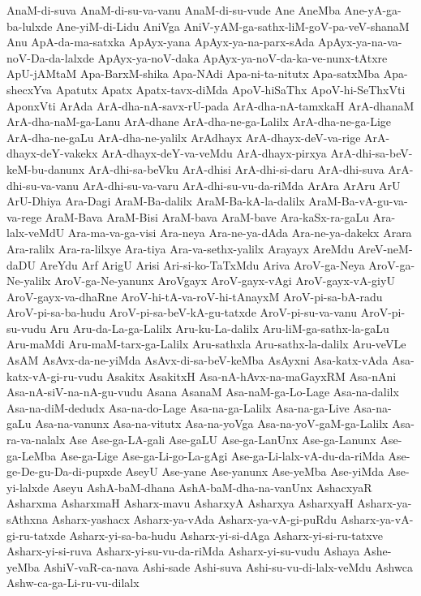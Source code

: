 {AnaM-di-suva
AnaM-di-su-va-vanu
AnaM-di-su-vude
Ane
AneMba
Ane-yA-ga-ba-lulxde
Ane-yiM-di-Lidu
AniVga
AniV-yAM-ga-sathx-liM-goV-pa-veV-shanaM
Anu
ApA-da-ma-satxka
ApAyx-yana
ApAyx-ya-na-parx-sAda
ApAyx-ya-na-va-noV-Da-da-lalxde
ApAyx-ya-noV-daka
ApAyx-ya-noV-da-ka-ve-nunx-tAtxre
ApU-jAMtaM
Apa-BarxM-shika
Apa-NAdi
Apa-ni-ta-nitutx
Apa-satxMba
Apa-shecxYva
Apatutx
Apatx
Apatx-tavx-diMda
ApoV-hiSaThx
ApoV-hi-SeThxVti
AponxVti
ArAda
ArA-dha-nA-savx-rU-pada
ArA-dha-nA-tamxkaH
ArA-dhanaM
ArA-dha-naM-ga-Lanu
ArA-dhane
ArA-dha-ne-ga-Lalilx
ArA-dha-ne-ga-Lige
ArA-dha-ne-gaLu
ArA-dha-ne-yalilx
ArAdhayx
ArA-dhayx-deV-va-rige
ArA-dhayx-deY-vakekx
ArA-dhayx-deY-va-veMdu
ArA-dhayx-pirxya
ArA-dhi-sa-beV-keM-bu-danunx
ArA-dhi-sa-beVku
ArA-dhisi
ArA-dhi-si-daru
ArA-dhi-suva
ArA-dhi-su-va-vanu
ArA-dhi-su-va-varu
ArA-dhi-su-vu-da-riMda
ArAra
ArAru
ArU
ArU-Dhiya
Ara-Dagi
AraM-Ba-dalilx
AraM-Ba-kA-la-dalilx
AraM-Ba-vA-gu-va-va-rege
AraM-Bava
AraM-Bisi
AraM-bava
AraM-bave
Ara-kaSx-ra-gaLu
Ara-lalx-veMdU
Ara-ma-va-ga-visi
Ara-neya
Ara-ne-ya-dAda
Ara-ne-ya-dakekx
Arara
Ara-ralilx
Ara-ra-lilxye
Ara-tiya
Ara-va-sethx-yalilx
Arayayx
AreMdu
AreV-neM-daDU
AreYdu
Arf
ArigU
Arisi
Ari-si-ko-TaTxMdu
Ariva
AroV-ga-Neya
AroV-ga-Ne-yalilx
AroV-ga-Ne-yanunx
AroVgayx
AroV-gayx-vAgi
AroV-gayx-vA-giyU
AroV-gayx-va-dhaRne
AroV-hi-tA-va-roV-hi-tAnayxM
AroV-pi-sa-bA-radu
AroV-pi-sa-ba-hudu
AroV-pi-sa-beV-kA-gu-tatxde
AroV-pi-su-va-vanu
AroV-pi-su-vudu
Aru
Aru-da-La-ga-Lalilx
Aru-ku-La-dalilx
Aru-liM-ga-sathx-la-gaLu
Aru-maMdi
Aru-maM-tarx-ga-Lalilx
Aru-sathxla
Aru-sathx-la-dalilx
Aru-veVLe
AsAM
AsAvx-da-ne-yiMda
AsAvx-di-sa-beV-keMba
AsAyxni
Asa-katx-vAda
Asa-katx-vA-gi-ru-vudu
Asakitx
AsakitxH
Asa-nA-hAvx-na-maGayxRM
Asa-nAni
Asa-nA-siV-na-nA-gu-vudu
Asana
AsanaM
Asa-naM-ga-Lo-Lage
Asa-na-dalilx
Asa-na-diM-dedudx
Asa-na-do-Lage
Asa-na-ga-Lalilx
Asa-na-ga-Live
Asa-na-gaLu
Asa-na-vanunx
Asa-na-vitutx
Asa-na-yoVga
Asa-na-yoV-gaM-ga-Lalilx
Asa-ra-va-nalalx
Ase
Ase-ga-LA-gali
Ase-gaLU
Ase-ga-LanUnx
Ase-ga-Lanunx
Ase-ga-LeMba
Ase-ga-Lige
Ase-ga-Li-go-La-gAgi
Ase-ga-Li-lalx-vA-du-da-riMda
Ase-ge-De-gu-Da-di-pupxde
AseyU
Ase-yane
Ase-yanunx
Ase-yeMba
Ase-yiMda
Ase-yi-lalxde
Aseyu
AshA-baM-dhana
AshA-baM-dha-na-vanUnx
AshacxyaR
Asharxma
AsharxmaH
Asharx-mavu
AsharxyA
Asharxya
AsharxyaH
Asharx-ya-sAthxna
Asharx-yashacx
Asharx-ya-vAda
Asharx-ya-vA-gi-puRdu
Asharx-ya-vA-gi-ru-tatxde
Asharx-yi-sa-ba-hudu
Asharx-yi-si-dAga
Asharx-yi-si-ru-tatxve
Asharx-yi-si-ruva
Asharx-yi-su-vu-da-riMda
Asharx-yi-su-vudu
Ashaya
Ashe-yeMba
AshiV-vaR-ca-nava
Ashi-sade
Ashi-suva
Ashi-su-vu-di-lalx-veMdu
Ashwca
Ashw-ca-ga-Li-ru-vu-dilalx
}
